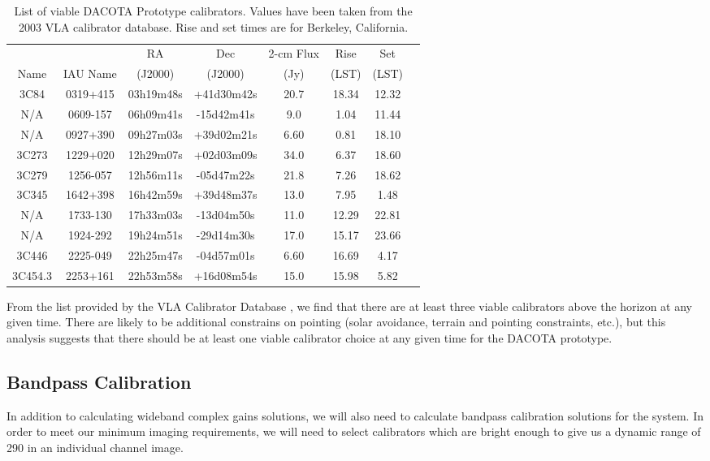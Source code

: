 \documentclass[preprint]{aastex}
\begin{document}
\begin{table}[!h]
\begin{center}
\begin{tabular}{|c|c||c|c|c|c|c|c} \hline
 & & RA & Dec & 2-cm Flux& Rise & Set \\
Name & IAU Name & (J2000) & (J2000) & (Jy) & (LST) & (LST) \\
\hline
\hline
3C84 & 0319+415 & 03h19m48s & +41d30m42s & 20.7 & 18.34 & 12.32 \\
N/A & 0609-157 & 06h09m41s & -15d42m41s & 9.0 & 1.04 & 11.44 \\
N/A & 0927+390 & 09h27m03s & +39d02m21s & 6.60 & 0.81 & 18.10 \\
3C273 & 1229+020 & 12h29m07s & +02d03m09s & 34.0 & 6.37 & 18.60 \\
3C279 & 1256-057 & 12h56m11s & -05d47m22s & 21.8 & 7.26 & 18.62 \\
3C345 & 1642+398 & 16h42m59s & +39d48m37s & 13.0 & 7.95 & 1.48 \\
N/A & 1733-130 & 17h33m03s & -13d04m50s & 11.0 & 12.29 & 22.81 \\
N/A & 1924-292 & 19h24m51s & -29d14m30s & 17.0 & 15.17 & 23.66 \\
3C446 & 2225-049 & 22h25m47s & -04d57m01s & 6.60 & 16.69 & 4.17 \\
3C454.3 & 2253+161 & 22h53m58s & +16d08m54s & 15.0 & 15.98 & 5.82 \\
\hline
\end{tabular}
\caption{List of viable DACOTA Prototype calibrators. Values have been taken from the 2003 VLA calibrator database. Rise and set times are for Berkeley, California.
\label{tablecal}} 
\end{center}
\end{table}

From the list provided by the VLA Calibrator Database \citep{VLACalCat}, we find that there are at least three viable calibrators above the horizon at any given time. There are likely to be additional constrains on pointing (solar avoidance, terrain and pointing constraints, etc.), but this analysis suggests that there should be at least one viable calibrator choice at any given time for the DACOTA prototype.

\subsection{Bandpass Calibration}\label{ssecbandpass}

In addition to calculating wideband complex gains solutions, we will also need to calculate bandpass calibration solutions for the system. In order to meet our minimum imaging requirements, we will need to select calibrators which are bright enough to give us a dynamic range of 290 in an individual channel image.
\end{document}
